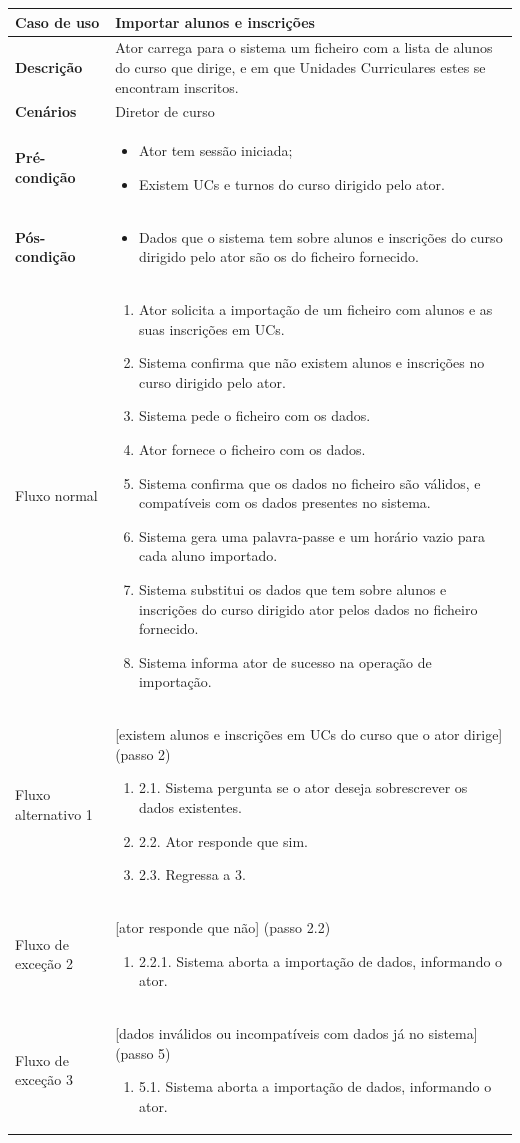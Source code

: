 \documentclass[12pt, a4paper]{article}
\newenvironment{condition}{
    \begin{itemize}[wide=0pt]
        \vspace{-0.2cm}
}{
        \vspace{-0.5cm}
    \end{itemize}
}
\newcommand\flow[1]{
    Fluxo normal &
    \singlespacing
    \begin{enumerate}[wide=0pt]
        #1
        \vspace{-0.3cm}
    \end{enumerate} \\ \hline
}
\newcommand\otherflow[3]{
    #1 &
    #2
    \singlespacing
    \begin{enumerate}[wide=0pt]
        #3
        \vspace{-0.3cm}
    \end{enumerate} \\ \hline
}
\newenvironment{usecase}[5]{
    \begin{table}[H]
        \centering
        \begin{tabular}{|>{\centering\arraybackslash\bf}m{3cm}|m{13cm}|}
            \hline
            Caso de uso & \textbf{#1} \\

            \hline
            Descrição & #2 \\

            \hline
            Cenários & #3 \\

            \hline
            Pré-condição &
            \begin{condition}
                #4
            \end{condition} \\

            \hline
            Pós-condição &
            \begin{condition}
                #5
            \end{condition} \\

            \hline
}{
    \end{tabular}
\end{table}
}
\begin{document}
\begin{usecase}
    {Importar alunos e inscrições}
    {
        Ator carrega para o sistema um ficheiro com a lista de alunos do curso que dirige, e em que
        Unidades Curriculares estes se encontram inscritos.
    }
    {Diretor de curso}
    {
        \item Ator tem sessão iniciada;
        \item Existem UCs e turnos do curso dirigido pelo ator.
    }
    {
        \item Dados que o sistema tem sobre alunos e inscrições do curso dirigido pelo ator são os
            do ficheiro fornecido.
    }

    \flow{
        \item Ator solicita a importação de um ficheiro com alunos e as suas inscrições em UCs.
        \item Sistema confirma que não existem alunos e inscrições no curso dirigido pelo ator.
        \item Sistema pede o ficheiro com os dados.
        \item Ator fornece o ficheiro com os dados.
        \item Sistema confirma que os dados no ficheiro são válidos, e compatíveis com os dados
            presentes no sistema.
        \item Sistema gera uma palavra-passe e um horário vazio para cada aluno importado.
        \item Sistema substitui os dados que tem sobre alunos e inscrições do curso dirigido ator
            pelos dados no ficheiro fornecido.
        \item Sistema informa ator de sucesso na operação de importação.
    }

    \otherflow{Fluxo alternativo 1}
        {[existem alunos e inscrições em UCs do curso que o ator dirige] (passo 2)}{

        \item[2.1.] Sistema pergunta se o ator deseja sobrescrever os dados existentes.
        \item[2.2.] Ator responde que sim.
        \item[2.3.] Regressa a 3.
    }

    \otherflow{Fluxo de exceção 2}{[ator responde que não] (passo 2.2)}{
        \item[2.2.1.] Sistema aborta a importação de dados, informando o ator.
    }

    \otherflow{Fluxo de exceção 3}
        {[dados inválidos ou incompatíveis com dados já no sistema] (passo 5)}{

        \item[5.1.] Sistema aborta a importação de dados, informando o ator.
    }
\end{usecase}
\end{document}
